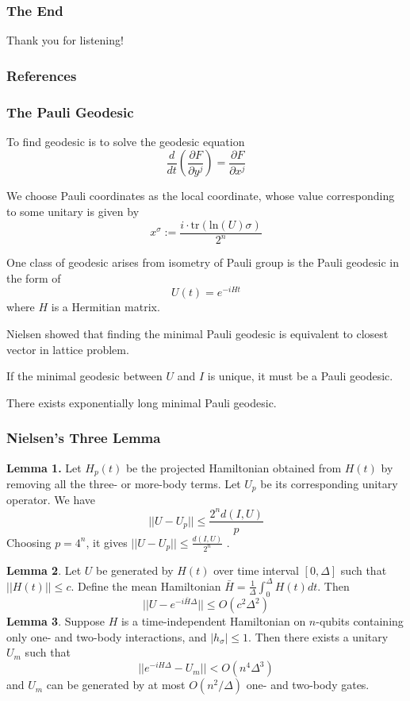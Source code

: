 \documentclass[aspectratio=169]{beamer}
\begin{document}
\begin{frame}
	\frametitle{The End}
	Thank you for listening!
\end{frame}

\begin{frame}[allowframebreaks]
	\frametitle{References}
	\printbibliography
\end{frame}

\begin{frame}[allowframebreaks]
	\frametitle{The Pauli Geodesic}

To find geodesic is to solve the geodesic equation
$$
	\frac{d}{dt}\left(\frac{\partial F}{\partial y^j}\right) = \frac{\partial F}{\partial x^j}
$$

We choose Pauli coordinates as the local coordinate, whose value corresponding to some unitary is given by 
$$
x^{\sigma}:= \frac{i \cdot \text{tr}(\text{ln}(U)\sigma)}{2^n}
$$ 

One class of geodesic arises from isometry of Pauli group is the Pauli geodesic in the form of 
$$
U(t) = e^{-i H t}
$$
where $H$ is a Hermitian matrix.

Nielsen showed that finding the minimal Pauli geodesic is equivalent to closest vector in lattice problem.

\begin{theorem}
If the minimal geodesic between $U$ and $I$ is unique, it must be a Pauli geodesic.
\end{theorem}
\begin{theorem}
There exists exponentially long minimal Pauli geodesic.
\end{theorem}
\end{frame}


\begin{frame}[allowframebreaks]
\frametitle{Nielsen's Three Lemma}

\textbf{Lemma 1.}
Let $H_p(t)$ be the projected Hamiltonian obtained from $H(t)$ by removing all the three- or more-body terms. Let $U_p$ be its corresponding unitary operator. 
We have 
$$
	||U - U_p|| \leq \frac{2^n d(I, U)}{p}
$$
Choosing $p = 4^n$, it gives $||U - U_p || \leq \frac{d(I, U)}{2^n}$ .

\textbf{Lemma 2}.
Let $U$ be generated by $H(t)$ over time interval $[0, \Delta]$ such that $||H(t)|| \leq c$.
Define the mean Hamiltonian $\bar{H} = \frac{1}{\Delta} \int_0^{\Delta} H(t) dt$. 
Then 
$$
	||U - e^{-i\bar{H}\Delta}|| \leq O(c^2 \Delta^2)
$$
\textbf{Lemma 3}.
Suppose $H$ is a time-independent Hamiltonian on $n$-qubits containing only one- and two-body interactions, and $|h_{\sigma}| \leq 1$.
Then there exists a unitary $U_m$ such that
$$	||e^{-iH\Delta} - U_m|| <  O(n^4 \Delta^3)$$
and $U_m$ can be generated by at most $O(n^2/\Delta)$ one- and two-body gates.

\end{frame}
\end{document}
